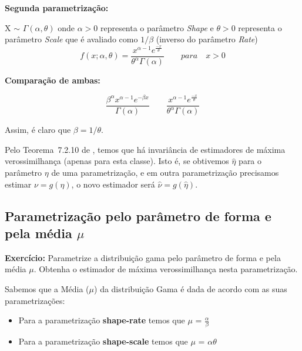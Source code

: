 \textbf{Segunda parametrização:}

X $\sim$ \begin{math} \Gamma(\alpha, \theta) \end{math} onde \begin{math} \alpha > 0 \end{math} representa o parâmetro \textit{Shape} e \begin{math} \theta > 0 \end{math} representa o parâmetro \textit{Scale} que é avaliado como \begin{math} 1/ \beta \end{math} (inverso do parâmetro \textit{Rate})
\begin{equation}
f(x; \alpha, \theta )=\frac{x^{\alpha-1}e^{\frac{-x}{\theta}}}{\theta^{\alpha}\Gamma(\alpha)} \qquad para \quad x > 0 \label{eq:fdp2}
\end{equation}

\textbf{Comparação de ambas:}

\begin{equation}
\frac{\beta^{\alpha}x^{\alpha-1}e^{-\beta x}}{\Gamma(\alpha)} \qquad \frac{x^{\alpha-1}e^{\frac{-x}{\theta}}}{\theta^{\alpha}\Gamma(\alpha)}
\end{equation}

Assim, é claro que $\beta = 1/\theta$.

Pelo Teorema~7.2.10 de \citet{CasellaBergerStatisticalInference}, temos que há invariância de estimadores de máxima verossimilhança (apenas para esta classe).
Isto é, se obtivemos $\widehat{\eta}$ para o parâmetro $\eta$ de uma parametrização, e em outra parametrização precisamos estimar $\nu=g(\eta)$, o novo estimador será $\widehat{\nu}=g(\widehat{\eta})$.


\subsection{Parametrização pelo parâmetro de forma e pela média $\mu$}

\textbf{Exercício:} Parametrize a distribuição gama pelo parâmetro de forma e pela média $\mu$.
Obtenha o estimador de máxima verossimilhança nesta parametrização.

Sabemos que a Média ($\mu$) da distribuição Gama é dada de acordo com as suas parametrizações:

\begin{itemize}
\item Para a parametrização \textbf{shape-rate} temos que $\mu$ = $\frac{\alpha}{\beta}$
\item Para a parametrização \textbf{shape-scale} temos que $\mu$ = $\alpha \theta$
\end{itemize}

